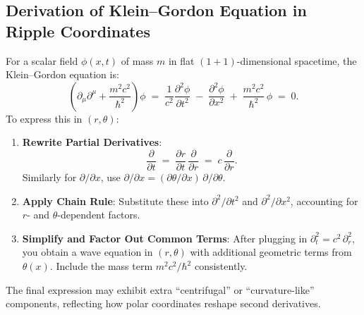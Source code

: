 \documentclass{article}
\begin{document}
\subsection{Derivation of Klein--Gordon Equation in Ripple Coordinates}
\label{app:sec:KG-derivation}
For a scalar field $\phi(x,t)$ of mass $m$ in flat $(1+1)$-dimensional spacetime, 
the Klein--Gordon equation is:
\[
  \left(\partial_\mu\partial^\mu + \frac{m^2c^2}{\hbar^2}\right)\phi \;=\; 
  \frac{1}{c^2}\frac{\partial^2 \phi}{\partial t^2} \;-\;\frac{\partial^2 \phi}{\partial x^2}
  \;+\;\frac{m^2 c^2}{\hbar^2}\,\phi \;=\; 0.
\]
To express this in $(r,\theta)$:
\begin{enumerate}
  \item \textbf{Rewrite Partial Derivatives}: 
    \[
      \frac{\partial}{\partial t} 
      \;=\; \frac{\partial r}{\partial t}\,\frac{\partial}{\partial r} 
      \;=\; c\,\frac{\partial}{\partial r}.
    \]
    Similarly for $\partial/\partial x$, use 
    \(\partial/\partial x = (\partial\theta/\partial x)\,\partial/\partial \theta\).
  \item \textbf{Apply Chain Rule}: 
    Substitute these into $\partial^2/\partial t^2$ and $\partial^2/\partial x^2$, 
    accounting for $r$- and $\theta$-dependent factors.
  \item \textbf{Simplify and Factor Out Common Terms}: 
    After plugging in $\partial_t^2 = c^2\,\partial_r^2$, you obtain a wave equation 
    in $(r,\theta)$ with additional geometric terms from $\theta(x)$. 
    Include the mass term $m^2c^2/\hbar^2$ consistently.
\end{enumerate}
The final expression may exhibit extra “centrifugal” or “curvature-like” components, 
reflecting how polar coordinates reshape second derivatives.
\end{document}
